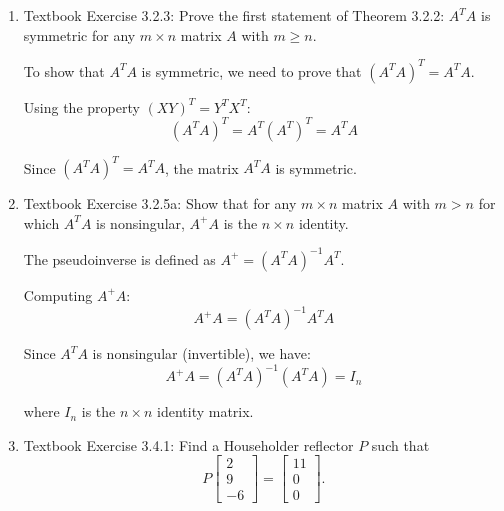 \documentclass[reqno, answers]{exam}
\begin{document}
\begin{enumerate}
\begin{solution}
The pseudoinverse is:
\[
A^+ = (A^T A)^{-1} A^T = \frac{1}{14} \begin{bmatrix} 1 & -2 & 3 \end{bmatrix} = \begin{bmatrix} \frac{1}{14} & -\frac{2}{14} & \frac{3}{14} \end{bmatrix} = \begin{bmatrix} \frac{1}{14} & -\frac{1}{7} & \frac{3}{14} \end{bmatrix}
\]
\end{solution}

\item Textbook Exercise 3.2.3: Prove the first statement of Theorem 3.2.2: $A^T A$ is symmetric for any $m \times n$ matrix $A$ with $m \geq n$.

\begin{solution}
To show that $A^T A$ is symmetric, we need to prove that $(A^T A)^T = A^T A$.

Using the property $(XY)^T = Y^T X^T$:
\[
(A^T A)^T = A^T (A^T)^T = A^T A
\]

Since $(A^T A)^T = A^T A$, the matrix $A^T A$ is symmetric.
\end{solution}

\item Textbook Exercise 3.2.5a: Show that for any $m \times n$ matrix $A$ with $m > n$ for which $A^T A$ is nonsingular, $A^+ A$ is the $n \times n$ identity.

\begin{solution}
The pseudoinverse is defined as $A^+ = (A^T A)^{-1} A^T$.

Computing $A^+ A$:
\[
A^+ A = (A^T A)^{-1} A^T A
\]

Since $A^T A$ is nonsingular (invertible), we have:
\[
A^+ A = (A^T A)^{-1} (A^T A) = I_n
\]

where $I_n$ is the $n \times n$ identity matrix.
\end{solution}

\item Textbook Exercise 3.4.1: Find a Householder reflector $P$ such that
\[
P \begin{bmatrix} 2 \\ 9 \\ -6 \end{bmatrix} = \begin{bmatrix} 11 \\ 0 \\ 0 \end{bmatrix}.
\]


\end{enumerate}
\end{document}
